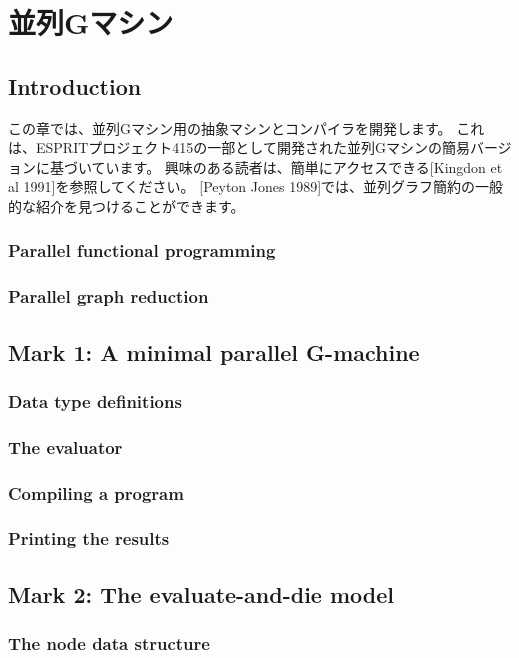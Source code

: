 \documentclass{jarticle}
\begin{document}
\section{並列Gマシン}

\subsection{Introduction}

この章では、並列Gマシン用の抽象マシンとコンパイラを開発します。
これは、ESPRITプロジェクト415の一部として開発された並列Gマシンの簡易バージョンに基づいています。
興味のある読者は、簡単にアクセスできる[Kingdon et al 1991]を参照してください。
[Peyton Jones 1989]では、並列グラフ簡約の一般的な紹介を見つけることができます。

\subsubsection{Parallel functional programming}
\subsubsection{Parallel graph reduction}
\newpage

\subsection{Mark 1: A minimal parallel G-machine}
\subsubsection{Data type definitions}
\subsubsection{The evaluator}
\subsubsection{Compiling a program}
\subsubsection{Printing the results}
\newpage

\subsection{Mark 2: The evaluate-and-die model}
\subsubsection{The node data structure}
\end{document}
